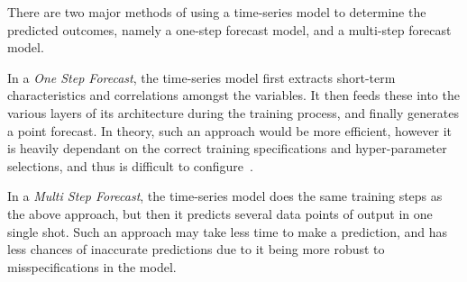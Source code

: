 There are two major methods of using a time-series model to determine the predicted outcomes, namely a one-step forecast model, and a multi-step forecast model.\par

In a \textit{One Step Forecast}, the time-series model first extracts short-term characteristics and correlations amongst the variables. It then feeds these into the various layers of its architecture during the training process, and finally generates a point forecast. In theory, such an approach would be more efficient, however it is heavily dependant on the correct training specifications and hyper-parameter selections, and thus is difficult to configure~\cite{marcellino2006comparison}.\par

In a \textit{Multi Step Forecast}, the time-series model does the same training steps as the above approach, but then it predicts several data points of output in one single shot. Such an approach may take less time to make a prediction, and has less chances of inaccurate predictions due to it being more robust to misspecifications in the model.

